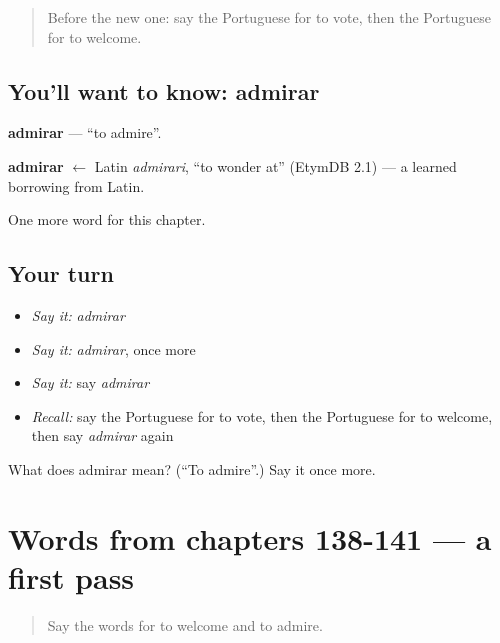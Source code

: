 \begin{quote}
Before the new one: say the Portuguese for to vote, then the Portuguese for to welcome.
\end{quote}

\subsection*{You'll want to know: admirar}
\textbf{admirar} — \textquotedblleft{}to admire\textquotedblright{}.

\begin{cousinweb}
\textbf{admirar} $\leftarrow$ Latin \emph{admirari}, \textquotedblleft{}to wonder at\textquotedblright{} (EtymDB 2.1) — a learned borrowing from Latin.
\end{cousinweb}

\begin{grammarlens}[title={What you've built}]
One more word for this chapter.
\end{grammarlens}

\subsection*{Your turn}
\begin{itemize}
\raggedright
  \item \emph{Say it:} \emph{admirar}
  \item \emph{Say it:} \emph{admirar}, once more
  \item \emph{Say it:} say \emph{admirar}
  \item \emph{Recall:} say the Portuguese for to vote, then the Portuguese for to welcome, then say \emph{admirar} again
\end{itemize}

\begin{tcolorbox}[breakable,colback=teal!4,colframe=teal!35!black,title={Before you move on}]
What does admirar mean? (\textquotedblleft{}To admire\textquotedblright{}.) Say it once more.
\end{tcolorbox}
\section[(dialogue)]{Words from chapters 138-141 — a first pass}

\label{lesson:PT-R146-first-pass-words-from-chapters-138-141}



\begin{quote}
Say the words for to welcome and to admire.
\end{quote}

